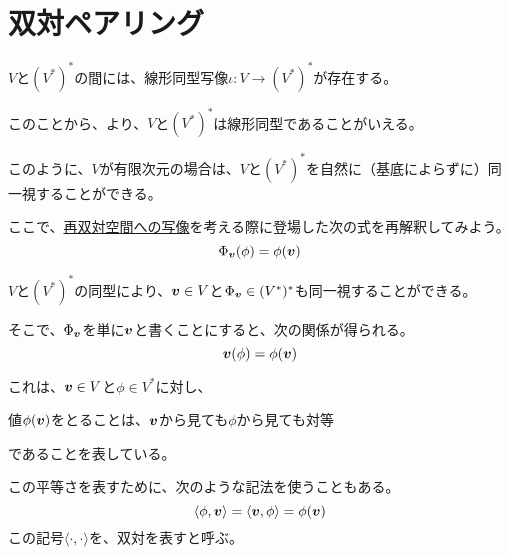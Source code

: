 \documentclass[../../../topic_linear-algebra]{subfiles}
\begin{document}
\sectionline
\section{双対ペアリング}

$V$と$(V^*)^*$の間には、線形同型写像$\iota \colon V \to (V^*)^*$が存在する。

このことから、より、$V$と$(V^*)^*$は線形同型であることがいえる。

\br

このように、$V$が有限次元の場合は、$V$と$(V^*)^*$を自然に（基底によらずに）同一視することができる。

\br

ここで、\hyperref[sec:map-to-bidual]{再双対空間への写像}を考える際に登場した次の式を再解釈してみよう。
\begin{equation*}
  \Phi_{\vb*{v}}(\phi) = \phi(\vb*{v})
\end{equation*}

$V$と$(V^*)^*$の同型により、$\vb*{v} \in V$と$\Phi_{\vb*{v}} \in (V^*)^*$も同一視することができる。

そこで、$\Phi_{\vb*{v}}$を単に$\vb*{v}$と書くことにすると、次の関係が得られる。
\begin{equation*}
  \vb*{v}(\phi) = \phi(\vb*{v})
\end{equation*}

これは、$\vb*{v} \in V$と$\phi \in V^*$に対し、
\begin{emphabox}
  \begin{spacebox}
    \begin{center}
      値$\phi(\vb*{v})$をとることは、$\vb*{v}$から見ても$\phi$から見ても対等
    \end{center}
  \end{spacebox}
\end{emphabox}
であることを表している。

\br

この平等さを表すために、次のような記法を使うこともある。
\begin{equation*}
  \langle \phi, \vb*{v} \rangle = \langle \vb*{v}, \phi \rangle = \phi(\vb*{v})
\end{equation*}
この記号$\langle \cdot, \cdot \rangle$を、双対を表すと呼ぶ。
\end{document}
